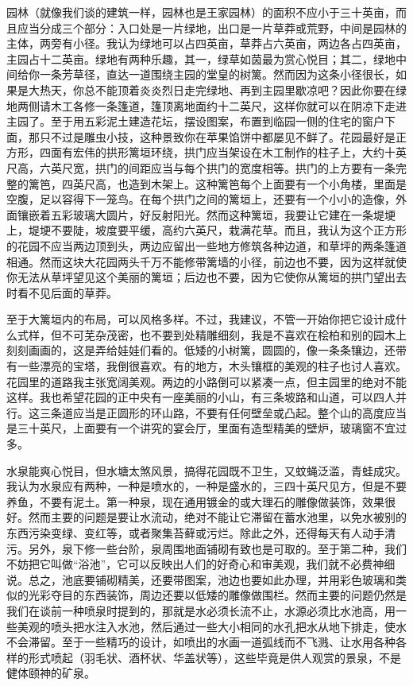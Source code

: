 \par 园林（就像我们谈的建筑一样，园林也是王家园林）的面积不应小于三十英亩，而且应当分成三个部分：入口处是一片绿地，出口是一片草莽或荒野，中间是园林的主体，两旁有小径。我认为绿地可以占四英亩，草莽占六英亩，两边各占四英亩，主园占十二英亩。绿地有两种乐趣，其一，绿草如茵最为赏心悦目；其二，绿地中间给你一条芳草径，直达一道围绕主园的堂皇的树篱。然而因为这条小径很长，如果是大热天，你总不能顶着炎炎烈日走完绿地、再到主园里歇凉吧？因此你要在绿地两侧请木工各修一条篷道，篷顶离地面约十二英尺，这样你就可以在阴凉下走进主园了。至于用五彩泥土建造花坛，摆设图案，布置到临园一侧的住宅的窗户下面，那只不过是雕虫小技，这种景致你在苹果馅饼中都屡见不鲜了。花园最好是正方形，四面有宏伟的拱形篱垣环绕，拱门应当架设在木工制作的柱子上，大约十英尺高，六英尺宽，拱门的间距应当与每个拱门的宽度相等。拱门的上方要有一条完整的篱笆，四英尺高，也造到木架上。这种篱笆每个上面要有一个小角楼，里面是空腹，足以容得下一笼鸟。在每个拱门之间的篱垣上，还要有一个小小的造像，外面镶嵌着五彩玻璃大圆片，好反射阳光。然而这种篱垣，我要让它建在一条堤埂上，堤埂不要陡，坡度要平缓，高约六英尺，栽满花草。而且，我认为这个正方形的花园不应当两边顶到头，两边应留出一些地方修筑各种边道，和草坪的两条篷道相通。然而这块大花园两头千万不能修带篱墙的小径，前边也不要，因为这样就使你无法从草坪望见这个美丽的篱垣；后边也不要，因为它使你从篱垣的拱门望出去时看不见后面的草莽。
\par 至于大篱垣内的布局，可以风格多样。不过，我建议，不管一开始你把它设计成什么式样，但不可芜杂茂密，也不要到处精雕细刻，我是不喜欢在桧柏和别的园木上刻刻画画的，这是弄给娃娃们看的。低矮的小树篱，圆圆的，像一条条镶边，还带有一些漂亮的宝塔，我倒很喜欢。有的地方，木头镶框的美观的柱子也讨人喜欢。花园里的道路我主张宽阔美观。两边的小路倒可以紧凑一点，但主园里的绝对不能这样。我也希望花园的正中央有一座美丽的小山，有三条坡路和山道，可以四人并行。这三条道应当是正圆形的环山路，不要有任何壁垒或凸起。整个山的高度应当是三十英尺，上面要有一个讲究的宴会厅，里面有造型精美的壁炉，玻璃窗不宜过多。
\par 水泉能爽心悦目，但水塘太煞风景，搞得花园既不卫生，又蚊蝇泛滥，青蛙成灾。我认为水泉应有两种，一种是喷水的，一种是盛水的，三四十英尺见方，但是不要养鱼，不要有泥土。第一种泉，现在通用镀金的或大理石的雕像做装饰，效果很好。然而主要的问题是要让水流动，绝对不能让它滞留在蓄水池里，以免水被别的东西污染变绿、变红等，或者聚集苔藓或污烂。除此之外，还得每天有人动手清污。另外，泉下修一些台阶，泉周围地面铺砌有致也是可取的。至于第二种，我们不妨把它叫做“浴池”，它可以反映出人们的好奇心和审美观，我们就不必费神细说。总之，池底要铺砌精美，还要带图案，池边也要如此办理，并用彩色玻璃和类似的光彩夺目的东西装饰，周边还要以低矮的雕像做围栏。然而主要的问题仍然是我们在谈前一种喷泉时提到的，那就是水必须长流不止，水源必须比水池高，用一些美观的喷头把水注入水池，然后通过一些大小相同的水孔把水从地下排走，使水不会滞留。至于一些精巧的设计，如喷出的水画一道弧线而不飞溅、让水用各种各样的形式喷起（羽毛状、酒杯状、华盖状等），这些毕竟是供人观赏的景泉，不是健体颐神的矿泉。
